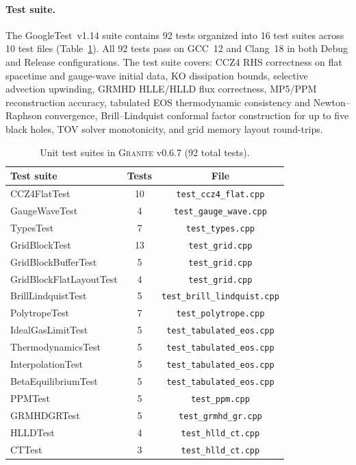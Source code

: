 \documentclass[aps,prd,twocolumn,superscriptaddress,nofootinbib,showpacs,
               longbibliography]{revtex4-2}
\newcommand{\granite}{\textsc{Granite}}
\newcommand{\code}[1]{\texttt{#1}}
\begin{document}
\paragraph{Test suite.}
The GoogleTest~v1.14 suite contains 92 tests organized into 16 test suites
across 10 test files (Table~\ref{tab:tests}).
All 92 tests pass on GCC~12 and Clang~18 in both Debug and Release
configurations.
The test suite covers: CCZ4 RHS correctness on flat spacetime and gauge-wave
initial data, KO dissipation bounds, selective advection upwinding, GRMHD
HLLE/HLLD flux correctness, MP5/PPM reconstruction accuracy, tabulated EOS
thermodynamic consistency and Newton--Raphson convergence, Brill--Lindquist
conformal factor construction for up to five black holes, TOV solver
monotonicity, and grid memory layout round-trips.

\begin{table}[t]
\caption{Unit test suites in \granite{} v0.6.7 (92 total tests).}
\label{tab:tests}
\begin{ruledtabular}
\begin{tabular}{lcc}
  Test suite & Tests & File \\ \hline
  CCZ4FlatTest      & 10 & \code{test\_ccz4\_flat.cpp} \\
  GaugeWaveTest     &  4 & \code{test\_gauge\_wave.cpp} \\
  TypesTest         &  7 & \code{test\_types.cpp} \\
  GridBlockTest     & 13 & \code{test\_grid.cpp} \\
  GridBlockBufferTest & 5 & \code{test\_grid.cpp} \\
  GridBlockFlatLayoutTest & 4 & \code{test\_grid.cpp} \\
  BrillLindquistTest & 5 & \code{test\_brill\_lindquist.cpp} \\
  PolytropeTest     &  7 & \code{test\_polytrope.cpp} \\
  IdealGasLimitTest &  5 & \code{test\_tabulated\_eos.cpp} \\
  ThermodynamicsTest & 5 & \code{test\_tabulated\_eos.cpp} \\
  InterpolationTest &  5 & \code{test\_tabulated\_eos.cpp} \\
  BetaEquilibriumTest & 5 & \code{test\_tabulated\_eos.cpp} \\
  PPMTest           &  5 & \code{test\_ppm.cpp} \\
  GRMHDGRTest       &  5 & \code{test\_grmhd\_gr.cpp} \\
  HLLDTest          &  4 & \code{test\_hlld\_ct.cpp} \\
  CTTest            &  3 & \code{test\_hlld\_ct.cpp} \\
\end{tabular}
\end{ruledtabular}
\end{table}
\end{document}
